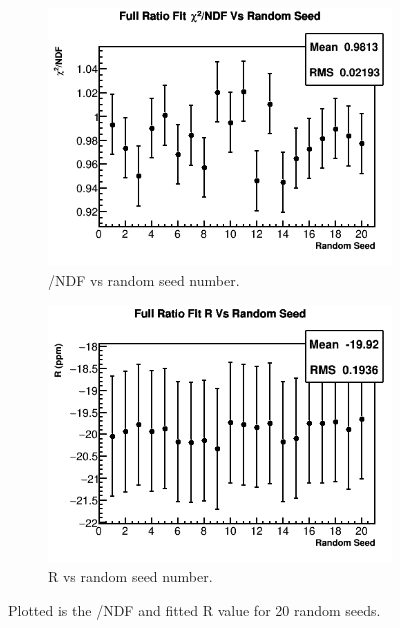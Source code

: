 		\begin{figure}[]
		\centering
		    \begin{subfigure}[t]{0.45\textwidth}
			    \centering
				\includegraphics[width=\textwidth]{RatioCBO_Chi2NDF_Vs_Iter_Canv}
			    \caption{\chisq/NDF vs random seed number.}
		    \end{subfigure}
		    \begin{subfigure}[t]{0.45\textwidth}
			    \centering
				\includegraphics[width=\textwidth]{RatioCBO_R_Vs_Iter_Canv}
			    \caption{R vs random seed number.}
		    \end{subfigure}%
		\caption[RandomSeeds]{Plotted is the \chisq/NDF and fitted R value for 20 random seeds.}
		\label{fig:RandomSeeds}
		\end{figure}

